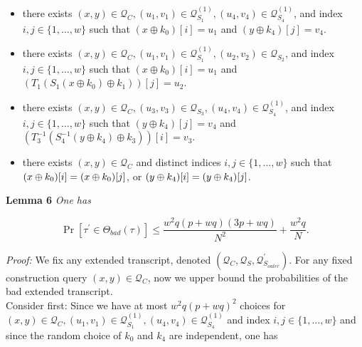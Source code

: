 \begin{itemize}
  \item\bone
  there exists $(x, y) \in \mathcal{Q}_{C}, \left(u_{1}, v_{1}\right) \in \mathcal{Q}_{S_{1}}^{(1)}, \left(u_{4}, v_{4}\right) \in \mathcal{Q}_{S_{4}}^{(1)}$, and index $i, j \in \{1, \ldots, w\}$ such that $\left(x \oplus k_{0}\right)[i]=u_1$ and $\left(y \oplus k_{4}\right)[j]=v_4$.
  \item\btwo
  there exists $(x,y) \in \mathcal{Q}_{C}, \left(u_{1}, v_{1}\right) \in \mathcal{Q}_{S_{1}}^{(1)}, \left(u_{2}, v_{2}\right) \in \mathcal{Q}_{S_{2}}$, and index $i, j \in \{1, \ldots, w\}$ such that $\left(x \oplus k_{0}\right)[i]=u_1$ and $\left(T_{1}\left(S_{1}\left(x \oplus k_{0}\right) \oplus k_{1}\right)\right)[j]=u_2$.
  \item\bthree
  there exists $(x,y) \in \mathcal{Q}_{C}, \left(u_{3}, v_{3}\right) \in \mathcal{Q}_{S_{3}}, \left(u_{4}, v_{4}\right) \in \mathcal{Q}_{S_{4}}^{(1)}$, and index $i, j \in \{1, \ldots, w\}$ such that $\left(y \oplus k_{4}\right)[j]=v_4$ and $\left(T_{3}^{-1}\left(S_{4}^{-1}\left(y \oplus k_{4}\right) \oplus k_{3}\right)\right)[i]=v_3$.
  \item\bfour 
  	there exists $(x,y) \in \mathcal{Q}_{C}$ and distinct indices $i, j \in \{1, \ldots, w\}$ such that $(x\oplus k_0)[i]=(x\oplus k_0)[j]$, or $(y\oplus k_4)[i]=(y\oplus k_4)[j]$.
\end{itemize}

\noindent \textbf{Lemma 6} \emph{One has}

\begin{equation}
\operatorname{Pr}[\tau^{\prime} \in \Theta_{bad}(\tau)] \leq \frac{w^2 q (p+w q) (3 p +w q)}{N^{2}} + \frac{w^{2} q}{N}.
\end{equation}

\noindent \emph{Proof:} We fix any extended transcript, denoted $\left(\mathcal{Q}_{C}, \mathcal{Q}_{S}, \mathcal{Q}_{S_{outer}}^{\prime}\right)$. For any fixed construction query $(x, y) \in \mathcal{Q}_{C}$, now we upper bound the probabilities of the bad extended transcript.\\

\noindent Consider \bone first: Since we have at most $w^{2} q \left(p+w q\right)^{2}$ choices for $(x, y) \in \mathcal{Q}_{C}, \left(u_{1}, v_{1}\right) \in \mathcal{Q}_{S_{1}}^{(1)}, \left(u_{4}, v_{4}\right) \in \mathcal{Q}_{S_{4}}^{(1)}$ and index $i, j \in \{1, \ldots, w\}$ and since the random choice of $k_{0}$ and $k_{4}$ are independent, one has

